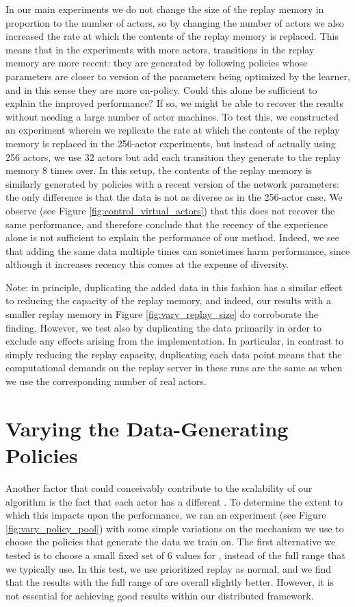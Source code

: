 \documentclass{article} \PassOptionsToPackage{usenames,dvipsnames}{xcolor}
\begin{document}
In our main experiments we do not change the size of the replay memory in proportion to the number of actors, so by changing the number of actors we also increased the rate at which the contents of the replay memory is replaced. This means that in the experiments with more actors, transitions in the replay memory are more recent: they are generated by following policies whose parameters are closer to version of the parameters being optimized by the learner, and in this sense they are more on-policy. Could this alone be sufficient to explain the improved performance? If so, we might be able to recover the results without needing a large number of actor machines. To test this, we constructed an experiment wherein we replicate the rate at which the contents of the replay memory is replaced in the 256-actor experiments, but instead of actually using 256 actors, we use 32 actors but add each transition they generate to the replay memory 8 times over. In this setup, the contents of the replay memory is similarly generated by policies with a recent version of the network parameters: the only difference is that the data is not as diverse as in the 256-actor case. We observe (see Figure \ref{fig:control_virtual_actors}) that this does not recover the same performance, and therefore conclude that the recency of the experience alone is not sufficient to explain the performance of our method. Indeed, we see that adding the same data multiple times can sometimes harm performance, since although it increases recency this comes at the expense of diversity.

Note: in principle, duplicating the added data in this fashion has a similar effect to reducing the capacity of the replay memory, and indeed, our results with a smaller replay memory in Figure \ref{fig:vary_replay_size} do corroborate the finding. However, we test also by duplicating the data primarily in order to exclude any effects arising from the implementation. In particular, in contrast to simply reducing the replay capacity, duplicating each data point means that the computational demands on the replay server in these runs are the same as when we use the corresponding number of real actors.

\section{Varying the Data-Generating Policies}

Another factor that could conceivably contribute to the scalability of our algorithm is the fact that each actor has a different . To determine the extent to which this impacts upon the performance, we ran an experiment (see Figure \ref{fig:vary_policy_pool}) with some simple variations on the mechanism we use to choose the policies that generate the data we train on. The first alternative we tested is to choose a small fixed set of 6 values for , instead of the full range that we typically use. In this test, we use prioritized replay as normal, and we find that the results with the full range of  are overall slightly better. However, it is not essential for achieving good results within our distributed framework.
\end{document}
